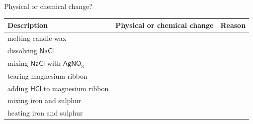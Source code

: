 \begin{Investigation}{Physical or chemical change? }
          \begin{table}[H]
        \begin{center}
      \label{m38709*id63990}
      \begin{tabular}{|l|l|l|}\hline
                  \textbf{Description}
                 &
                  \textbf{Physical or chemical change}
                 &
                  \textbf{Reason} \\ \hline
        melting candle wax &
         &
        \\ \hline
        dissolving $\mathsf{NaCl}$ &
         &
      \\ \hline
        mixing $\mathsf{NaCl}$ with ${\mathsf{AgNO}}_{3}$ &
         &
        \\ \hline
        tearing magnesium ribbon &
         &
       \\ \hline
        adding $\mathsf{HCl}$ to magnesium ribbon &
         &
        \\ \hline
        mixing iron and sulphur &
         &
        \\ \hline
        heating iron and sulphur &
         &
        \\ \hline
    \end{tabular}
      \end{center}
\end{table}
    \par
  \par 
\end{Investigation}
    \label{m38711*cid4}
